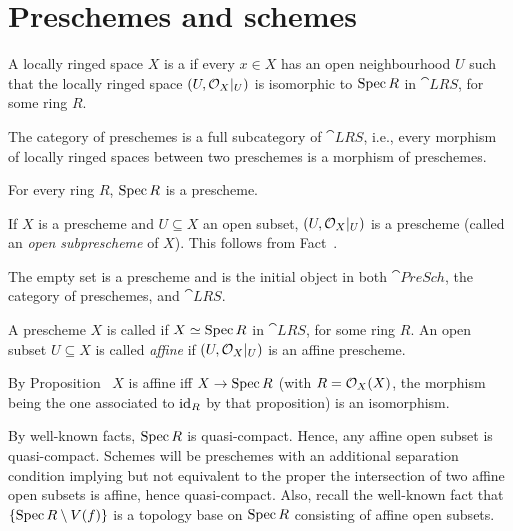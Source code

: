 \documentclass[a4paper,parskip=half,numbers=enddot, DIV=12]{scrreprt}
\begin{document}
\section{Preschemes and schemes}
\begin{defi} 
    A locally ringed space $X$ is a  if every $x\in X$ has an open neighbourhood $U$ such that the locally ringed space $(U,\mathcal{O}_X|_U)$ is isomorphic to $\operatorname{Spec} R$ in $\cat{LRS}$, for some ring $R$. 
    
    The category of preschemes is a full subcategory of $\cat{LRS}$, i.e., every morphism of locally ringed spaces between two preschemes is a morphism of preschemes.
\end{defi}
\begin{example}
    For every ring $R$, $\operatorname{Spec} R$ is a prescheme.
\end{example}
\begin{example}
    If $X$ is a prescheme and $U\subseteq X$ an open subset, $(U, \mathcal{O}_X|_U)$ is a prescheme (called an \emph{open subprescheme} of $X$). This follows from Fact~.
\end{example}
\begin{example*}
    The empty set is a prescheme and is the initial object in both $\cat{PreSch}$, the category of preschemes, and $\cat{LRS}$.
\end{example*}
\begin{defi}
    A prescheme $X$ is called  if $X\simeq \operatorname{Spec} R$ in $\cat{LRS}$, for some ring $R$. An open subset $U\subseteq X$ is called \emph{affine} if $(U,\mathcal{O}_X|_U)$ is an affine prescheme.
\end{defi}
\begin{rem*}
    By Proposition~ $X$ is affine iff $X\morphism \Spec R$ (with $R=\mathcal{O}_X(X)$, the morphism being the one associated to $\operatorname{id}_R$ by that proposition) is an isomorphism. 
\end{rem*}
\begin{rem*}
    By well-known facts, $\operatorname{Spec} R$ is quasi-compact. Hence, any affine open subset is quasi-compact. Schemes will be preschemes with an additional separation condition implying but not equivalent to the proper the intersection of two affine open subsets is affine, hence quasi-compact. Also, recall the well-known fact that $\left\{\operatorname{Spec} R\setminus V(f)\right\}$ is a topology base on $\operatorname{Spec} R$ consisting of affine open subsets. 
\end{rem*}
\end{document}
